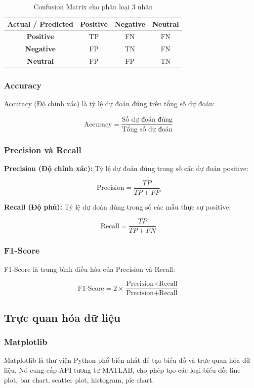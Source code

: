 \begin{table}[H]
\centering
\caption{Confusion Matrix cho phân loại 3 nhãn}
\begin{tabular}{|c|c|c|c|}
\hline
\textbf{Actual / Predicted} & \textbf{Positive} & \textbf{Negative} & \textbf{Neutral} \\
\hline
\textbf{Positive} & TP & FN & FN \\
\hline
\textbf{Negative} & FP & TN & FN \\
\hline
\textbf{Neutral} & FP & FP & TN \\
\hline
\end{tabular}
\end{table}

\subsubsection{Accuracy}
Accuracy (Độ chính xác) là tỷ lệ dự đoán đúng trên tổng số dự đoán:

\[
\text{Accuracy} = \frac{\text{Số dự đoán đúng}}{\text{Tổng số dự đoán}}
\]

\subsubsection{Precision và Recall}
\textbf{Precision (Độ chính xác):} Tỷ lệ dự đoán đúng trong số các dự đoán positive:

\[
\text{Precision} = \frac{TP}{TP + FP}
\]

\textbf{Recall (Độ phủ):} Tỷ lệ dự đoán đúng trong số các mẫu thực sự positive:

\[
\text{Recall} = \frac{TP}{TP + FN}
\]

\subsubsection{F1-Score}
F1-Score là trung bình điều hòa của Precision và Recall:

\[
\text{F1-Score} = 2 \times \frac{\text{Precision} \times \text{Recall}}{\text{Precision} + \text{Recall}}
\]

\subsection{Trực quan hóa dữ liệu}

\subsubsection{Matplotlib}
Matplotlib là thư viện Python phổ biến nhất để tạo biểu đồ và trực quan hóa dữ liệu. Nó cung cấp API tương tự MATLAB, cho phép tạo các loại biểu đồ: line plot, bar chart, scatter plot, histogram, pie chart.

